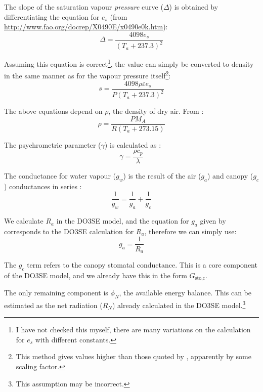 \documentclass[a4paper]{article}
\begin{document}
The slope of the saturation vapour \emph{pressure} curve ($\Delta$) is obtained by differentiating 
the equation for $e_s$ (from \url{http://www.fao.org/docrep/X0490E/x0490e0k.htm}):
\begin{equation}
\label{e:deltavp}
\Delta = \frac{4098 e_s}{(T_a + 237.3)^2}
\end{equation}

Assuming this equation is correct\footnote{I have not checked this myself, there are many variations 
on the calculation for $e_s$ with different constants.}, the value can simply be converted to 
density in the same manner as for the vapour pressure itself\footnote{This method gives values 
    higher than those quoted by \citet[p.~408]{thornley90}, apparently by some scaling factor.}:
\begin{equation}
s = \frac{4098 \rho \varepsilon e_s}{P(T_a + 237.3)^2}
\end{equation}

The above equations depend on $\rho$, the density of dry air.  From \citet[p.~12]{monteith90}:
\begin{equation}
\rho = \frac{P M_A}{R (T_a + 273.15)}
\end{equation}

The psychrometric parameter ($\gamma$) is calculated as \citet[p.~407]{thornley90}:
\begin{equation}
\gamma = \frac{\rho c_p}{\lambda}
\end{equation}

The conductance for water vapour ($g_w$) is the result of the air ($g_a$) and canopy ($g_c$) 
    conductances in series \citet[p.~407]{thornley90}:
\begin{equation}
\frac{1}{g_w} = \frac{1}{g_a} + \frac{1}{g_c}
\end{equation}

We calculate $R_a$ in the DO3SE model, and the equation for $g_a$ given by 
\citet[p.~415]{thornley90} corresponds to the DO3SE calculation for $R_a$, therefore we can simply 
use:
\begin{equation}
g_a = \frac{1}{R_a}
\end{equation}

The $g_c$ term refers to the canopy stomatal conductance.  This is a core component of the DO3SE 
model, and we already have this in the form $G_{\text{sto,c}}$.

The only remaining component is $\phi_N$, the available energy balance.  This can be estimated as 
the net radiation ($R_N$) already calculated in the DO3SE model.\footnote{This assumption may be 
    incorrect.}
\end{document}
